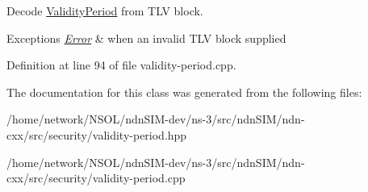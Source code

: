 Decode \hyperlink{classndn_1_1security_1_1ValidityPeriod}{Validity\+Period} from T\+LV block. 


\begin{DoxyExceptions}{Exceptions}
{\em \hyperlink{classndn_1_1security_1_1ValidityPeriod_1_1Error}{Error}} & when an invalid T\+LV block supplied \\
\hline
\end{DoxyExceptions}


Definition at line 94 of file validity-\/period.\+cpp.



The documentation for this class was generated from the following files\+:\begin{DoxyCompactItemize}
\item 
/home/network/\+N\+S\+O\+L/ndn\+S\+I\+M-\/dev/ns-\/3/src/ndn\+S\+I\+M/ndn-\/cxx/src/security/validity-\/period.\+hpp\item 
/home/network/\+N\+S\+O\+L/ndn\+S\+I\+M-\/dev/ns-\/3/src/ndn\+S\+I\+M/ndn-\/cxx/src/security/validity-\/period.\+cpp\end{DoxyCompactItemize}
